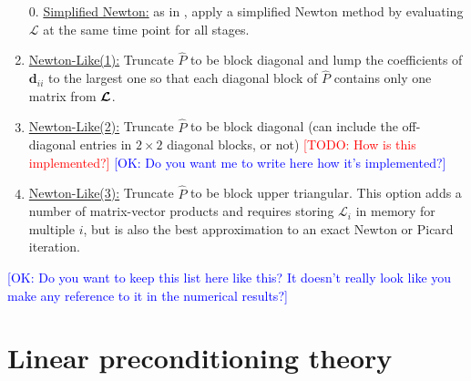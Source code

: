 \documentclass[review]{siamart}
\makeatletter
\newcommand{\todo}[1]{\textcolor{red}{[TODO\@: #1]}}
\newcommand{\OK}[1]{\textcolor{blue}{[OK: #1]}}
\makeatother
\begin{document}
\begin{enumerate}
\setlength\itemsep{0.5em}
\item[0.] \underline{Simplified Newton:} as in , apply a
simplified Newton method by evaluating $\mathcal{L}$ at the same time point for
all stages.

\item \underline{Newton-Like(1):} Truncate $\widehat{P}$ to be block diagonal and
lump the coefficients of $\bm{d}_{ii}$ to the largest one so that each diagonal
block of $\widehat{P}$ contains only one matrix from $\bm{{\cal L}}$.

\item \underline{Newton-Like(2):} Truncate $\widehat{P}$ to be block diagonal
(can include the off-diagonal entries in $2 \times 2$ diagonal blocks, or not)
\todo{How is this implemented?} \OK{Do you want me to write here how it's implemented?}

\item \underline{Newton-Like(3):} Truncate $\widehat{P}$ to be block upper triangular.
This option adds a number of matrix-vector products and requires storing $\mathcal{L}_i$
in memory for multiple $i$, but is also the best approximation to an exact Newton or
Picard iteration.

\end{enumerate}

\OK{Do you want to keep this list here like this? It doesn't really look like you make any reference to it in  the numerical results?}

\section{Linear preconditioning theory}\label{sec:theory}
\end{document}
